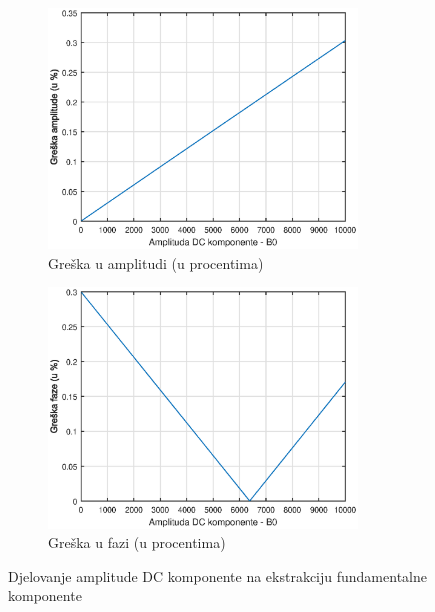 \begin{figure}[H]
    \centering
    \begin{subfigure}{0.45\textwidth}
        \centering
        \includegraphics[width=0.9\textwidth]{Slike_rezultati/Test_dc1.eps} %
        \caption{Greška u amplitudi (u procentima)}
    \end{subfigure}\hfill
    \begin{subfigure}{0.45\textwidth}
        \centering
        \includegraphics[width=0.9\textwidth]{Slike_rezultati/Test_dc2.eps} %
        \caption{Greška u fazi (u procentima)}
    \end{subfigure}
    \caption{Djelovanje amplitude DC komponente na ekstrakciju fundamentalne komponente }
    \label{fig:55}
\end{figure}

